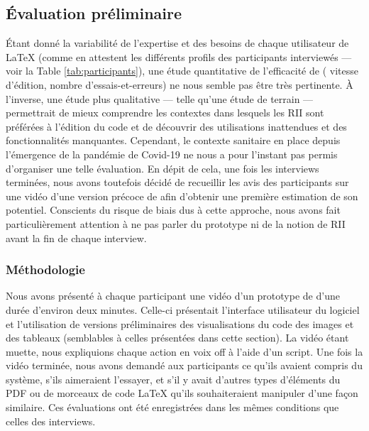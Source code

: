 \subsection{Évaluation préliminaire}
Étant donné la variabilité de l'expertise et des besoins de chaque utilisateur de \LaTeX{} (comme en attestent les différents profils des participants interviewés --- voir la {Table \ref{tab:participants}}), une étude quantitative de l'efficacité de \iLaTeX{} (\eg{} vitesse d'édition, nombre d'essais-et-erreurs) ne nous semble pas être très pertinente.
À l'inverse, une étude plus qualitative --- telle qu'une étude de terrain --- permettrait de mieux comprendre les contextes dans lesquels les RII sont préférées à l'édition du code et de découvrir des utilisations inattendues et des fonctionnalités manquantes.
Cependant, le contexte sanitaire en place depuis l'émergence de la pandémie de Covid-19 ne nous a pour l'instant pas permis d'organiser une telle évaluation.
En dépit de cela, une fois les interviews terminées, nous avons toutefois décidé de recueillir les avis des participants sur une vidéo d'une version précoce de \iLaTeX{} afin d'obtenir une première estimation de son potentiel.
Conscients du risque de biais dus à cette approche, nous avons fait particulièrement attention à ne pas parler du prototype ni de la notion de RII avant la fin de chaque interview.

\subsubsection{Méthodologie}
Nous avons présenté à chaque participant une vidéo d'un prototype de \iLaTeX{} d'une durée d'environ deux minutes.
Celle-ci présentait l'interface utilisateur du logiciel et l'utilisation de versions préliminaires des visualisations du code des images et des tableaux (semblables à celles présentées dans cette section).
La vidéo étant muette, nous expliquions chaque action en voix off à l'aide d'un script.
Une fois la vidéo terminée, nous avons demandé aux participants ce qu'ils avaient compris du système, s'ils aimeraient l'essayer, et s'il y avait d'autres types d'éléments du PDF ou de morceaux de code \LaTeX{} qu'ils souhaiteraient manipuler d'une façon similaire.
Ces évaluations ont été enregistrées dans les mêmes conditions que celles des interviews.

